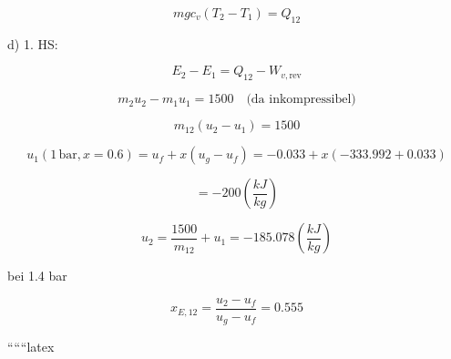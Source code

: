 \begin{equation}
mgc_v(T_2 - T_1) = Q_{12}
\end{equation}

d) 1. HS:

\begin{equation}
E_2 - E_1 = Q_{12} - W_{v, \text{rev}}
\end{equation}

\begin{equation}
m_2u_2 - m_1u_1 = 1500 \quad \text{(da inkompressibel)}
\end{equation}

\begin{equation}
m_{12}(u_2 - u_1) = 1500
\end{equation}

\begin{equation}
u_1(1 \, \text{bar}, x = 0.6) = u_f + x(u_g - u_f) = -0.033 + x(-333.992 + 0.033)
\end{equation}

\begin{equation}
= -200 \left(\frac{kJ}{kg}\right)
\end{equation}

\begin{equation}
u_2 = \frac{1500}{m_{12}} + u_1 = -185.078 \left(\frac{kJ}{kg}\right)
\end{equation}

bei 1.4 bar

\begin{equation}
x_{E,12} = \frac{u_2 - u_f}{u_g - u_f} = 0.555
\end{equation}

``````latex


